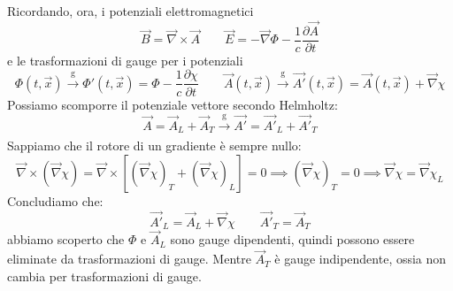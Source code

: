 Ricordando, ora, i potenziali elettromagnetici
\begin{equation*}
    \Vec{B}=\Vec{\nabla}\times\Vec{A}\qquad
    \Vec{E}=-\Vec{\nabla}\Phi-\dfrac{1}{c}\dfrac{\partial\Vec{A}}{\partial t}
\end{equation*}
e le trasformazioni di gauge per i potenziali
\begin{equation*}
    \Phi(t,\Vec{x})
   \xrightarrow[\text{}]{\text{g}}
  \Phi'(t,\Vec{x})
    =\Phi
    -\dfrac{1}{c}\dfrac{\partial \chi}{\partial t}\qquad
    \Vec{A}(t,\Vec{x})
   \xrightarrow[\text{}]{\text{g}}
  \Vec{A'}(t,\Vec{x})
    =\Vec{A}(t,\Vec{x})
    +\Vec{\nabla}\chi
\end{equation*}
Possiamo scomporre il potenziale vettore secondo Helmholtz:
\begin{equation*}
   \Vec{A}=\Vec{A}_L+\Vec{A}_T
   \xrightarrow[\text{}]{\text{g}}
  \Vec{A'}=\Vec{A'}_L+\Vec{A'}_T
\end{equation*}
Sappiamo che il rotore di un gradiente è sempre nullo:
\begin{equation*}
   \Vec{\nabla}\times(\Vec{\nabla}\chi)=\Vec{\nabla}\times[(\Vec{\nabla}\chi)_T+(\Vec{\nabla}\chi)_L]=0 \implies(\Vec{\nabla}\chi)_T=0 \implies\Vec{\nabla}\chi=\Vec{\nabla}\chi_L
\end{equation*}
Concludiamo che:
\begin{equation*}
   \Vec{A'}_L=\Vec{A}_L+\Vec{\nabla}\chi \qquad \Vec{A'}_T=\Vec{A}_T
\end{equation*}
abbiamo scoperto che $\Phi$ e $\Vec{A}_L$ sono gauge dipendenti, quindi possono essere eliminate da trasformazioni di gauge. Mentre $\Vec{A}_T$ è gauge indipendente, ossia non cambia per trasformazioni di gauge.
